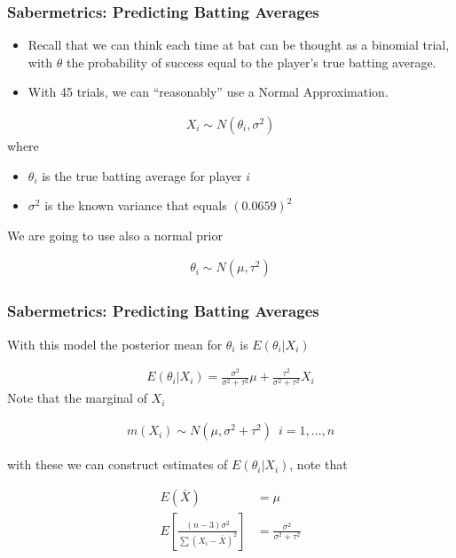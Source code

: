 \documentclass[
  shownotes,
  xcolor={svgnames},
  hyperref={colorlinks,citecolor=DarkBlue,linkcolor=DarkRed,urlcolor=DarkBlue}
  , aspectratio=169]{beamer}
\begin{document}
\begin{frame}[fragile]
\frametitle{Sabermetrics: Predicting Batting Averages}

\begin{itemize}
\item Recall that we can think each time at bat can be thought as a binomial trial, with $\theta$ the probability of success equal to the player's true batting average.
\item With 45 trials, we can ``reasonably'' use a Normal Approximation.
\end{itemize}

\begin{align}
  X_i \sim N(\theta_i,\sigma^2)
\end{align}
where

\begin{itemize}
  \item $\theta_i$ is the true batting average for player $i$
  \item $\sigma^2$ is the known variance that equals $(0.0659)^2$
\end{itemize}
We are going to use also a normal prior

\begin{align}
  \theta_i \sim N(\mu,\tau^2)
\end{align}

\end{frame}
\begin{frame}[fragile]
\frametitle{Sabermetrics: Predicting Batting Averages}
With this model the posterior mean for $\theta_i$ is $E(\theta_i|X_i)$

\begin{align}
E(\theta_i|X_i)=\frac{\sigma^2}{\sigma^2+\tau^2}\mu + \frac{\tau^2}{\sigma^2+\tau^2} X_i
\end{align}
Note that the marginal of $X_i$

\begin{align}
m(X_i)\sim N(\mu,\sigma^2+\tau^2)\,\,\,i=1,\dots,n
\end{align}

with these we can construct estimates of $E(\theta_i|X_i)$, note that

\begin{align}
E(\bar X)&=\mu \\
E\left[ \frac{(n-3)\sigma^2}{\sum(X_i-\bar X)^2}\right]&=\frac{\sigma^2}{\sigma^2+\tau^2}
\end{align}



\end{frame}
\end{document}

